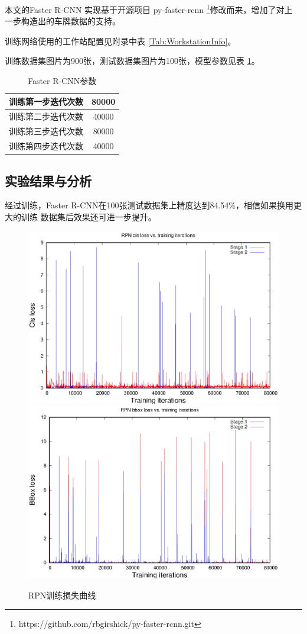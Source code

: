本文的Faster R-CNN 实现基于开源项目 py-faster-rcnn
\footnote{https://github.com/rbgirshick/py-faster-rcnn.git}修改而来，增加了对上
一步构造出的车牌数据的支持。

训练网络使用的工作站配置见附录中表 \ref{Tab:WorkstationInfo}。

训练数据集图片为900张，测试数据集图片为100张，模型参数见表 \ref{Tab:FasterRCNNArgs}。

\begin{table}[ht]
\centering
\caption{Faster R-CNN参数}\label{Tab:FasterRCNNArgs}
\begin{tabular}{|c|c|}
\hline
训练第一步迭代次数 & 80000 \\
\hline
训练第二步迭代次数 & 40000 \\
\hline 
训练第三步迭代次数 & 80000 \\
\hline 
训练第四步迭代次数 & 40000 \\
\hline
\end{tabular}
\end{table}

\subsection{实验结果与分析}

经过训练，Faster R-CNN在100张测试数据集上精度达到84.54\%，相信如果换用更大的训练
数据集后效果还可进一步提升。

\begin{figure}[ht]
\centering
{}
{\includegraphics[width=0.8\linewidth]{./Figure/RPNClsLoss.eps}}
{\includegraphics[width=0.8\linewidth]{./Figure/RPNBBoxLoss.eps}}
\caption{RPN训练损失曲线}
\end{figure}

